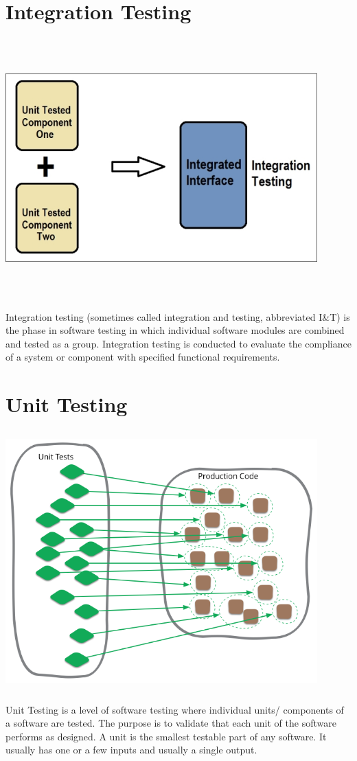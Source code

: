 \section{Integration Testing}
\begin{center}
    \includegraphics[width=12cm,height=10cm,keepaspectratio]{images/integration}
\end{center}
Integration testing (sometimes called integration and testing, abbreviated I&T) 
is the phase in software testing in which individual software modules are 
combined and tested as a group. Integration testing is conducted to evaluate the
compliance of a system or component with specified functional requirements.

\section{Unit Testing}
\begin{center}
    \includegraphics[width=12cm,height=10cm,keepaspectratio]{images/unit}
\end{center}
Unit Testing is a level of software testing where individual units/ components
of a software are tested. The purpose is to validate that each unit of the
software performs as designed. A unit is the smallest testable part of any 
software. It usually has one or a few inputs and usually a single output.

